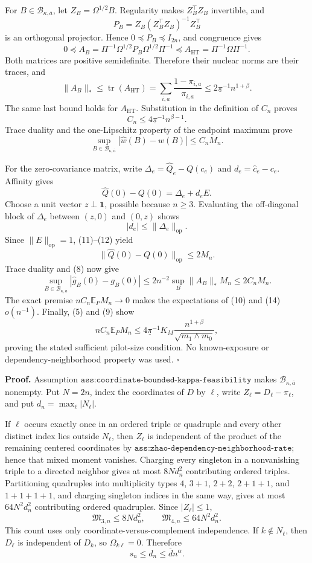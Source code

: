 For \(B\in\mathcal B_{\kappa,\overline a}\), let \(Z_B=\Omega^{1/2}B\).  Regularity makes \(Z_B^{\top}Z_B\) invertible, and
\[
P_B=Z_B(Z_B^{\top}Z_B)^{-1}Z_B^{\top}
\tag{6}
\]
is an orthogonal projector.  Hence \(0\preceq P_B\preceq I_{2n}\), and congruence gives
\[
0\preceq A_B
=\Pi^{-1}\Omega^{1/2}P_B\Omega^{1/2}\Pi^{-1}
\preceq A_{\mathrm{HT}}=\Pi^{-1}\Omega\Pi^{-1}.
\tag{7}
\]
Both matrices are positive semidefinite.  Therefore their nuclear norms are their traces, and
\[
\lVert A_B\rVert_*
\le\operatorname{tr}(A_{\mathrm{HT}})
=\sum_{i,a}\frac{1-\pi_{i,a}}{\pi_{i,a}}
\le2\underline\pi^{-1}n^{1+\beta}.
\tag{8}
\]
The same last bound holds for \(A_{\mathrm{HT}}\).  Substitution in the definition of \(C_n\) proves
\[
C_n\le4\underline\pi^{-1}n^{\beta-1}.
\tag{9}
\]
Trace duality and the one-Lipschitz property of the endpoint maximum prove
\[
\sup_{B\in\mathcal B_{\kappa,\overline a}}|\widehat w(B)-w(B)|\le C_nM_n.
\tag{10}
\]

For the zero-covariance matrix, write \(\Delta_e=\widehat Q_e-Q(c_e)\) and \(d_e=\widehat c_e-c_e\).  Affinity gives
\[
\widehat Q(0)-Q(0)=\Delta_e+d_eE.
\tag{11}
\]
Choose a unit vector \(z\perp\mathbf1\), possible because \(n\ge3\).  Evaluating the off-diagonal block of \(\Delta_e\) between \((z,0)\) and \((0,z)\) shows
\[
|d_e|\le\lVert\Delta_e\rVert_{\mathrm{op}}.
\tag{12}
\]
Since \(\lVert E\rVert_{\mathrm{op}}=1\), (11)--(12) yield
\[
\lVert\widehat Q(0)-Q(0)\rVert_{\mathrm{op}}\le2M_n.
\tag{13}
\]
Trace duality and (8) now give
\[
\sup_{B\in\mathcal B_{\kappa,\overline a}}|\widehat g_B(0)-g_B(0)|
\le2n^{-2}\sup_B\lVert A_B\rVert_*M_n
\le2C_nM_n.
\tag{14}
\]
The exact premise \(nC_n\mathbb E_PM_n\to0\) makes the expectations of (10) and (14) \(o(n^{-1})\).  Finally, (5) and (9) show
\[
nC_n\mathbb E_PM_n
\le4\underline\pi^{-1}K_M\frac{n^{1+\beta}}{\sqrt{m_1\wedge m_0}},
\]
proving the stated sufficient pilot-size condition.  No known-exposure or dependency-neighborhood property was used. \(\square\)

\textbf{Proof.}
Assumption \(\texttt{ass:coordinate-bounded-kappa-feasibility}\) makes \(\mathcal B_{\kappa,\overline a}\) nonempty.  Put \(N=2n\), index the coordinates of \(D\) by \(\ell\), write \(Z_\ell=D_\ell-\pi_\ell\), and put \(d_n=\max_\ell|N_\ell|\).

If \(\ell\) occurs exactly once in an ordered triple or quadruple and every other distinct index lies outside \(N_\ell\), then \(Z_\ell\) is independent of the product of the remaining centered coordinates by \(\texttt{ass:zhao-dependency-neighborhood-rate}\); hence that mixed moment vanishes.  Charging every singleton in a nonvanishing triple to a directed neighbor gives at most \(8Nd_n^2\) contributing ordered triples.  Partitioning quadruples into multiplicity types \(4\), \(3+1\), \(2+2\), \(2+1+1\), and \(1+1+1+1\), and charging singleton indices in the same way, gives at most \(64N^2d_n^2\) contributing ordered quadruples.  Since \(|Z_\ell|\le1\),
\[
\mathfrak M_{3,n}\le8Nd_n^2,
\qquad
\mathfrak M_{4,n}\le64N^2d_n^2.
\tag{1}
\]
This count uses only coordinate-versus-complement independence.  If \(k\notin N_\ell\), then \(D_\ell\) is independent of \(D_k\), so \(\Omega_{k\ell}=0\).  Therefore
\[
s_n\le d_n\le\overline d n^\alpha.
\tag{2}
\]

